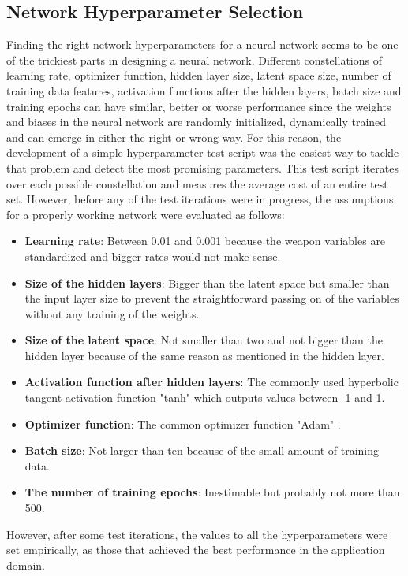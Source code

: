 \documentclass[MGS,Master,english]{twbook}%
\begin{document}
\subsection{Network Hyperparameter Selection} \label{chapter::vae::network}
Finding the right network hyperparameters for a neural network seems to be one of the trickiest parts in designing a neural network. Different constellations of learning rate, optimizer function, hidden layer size, latent space size, number of training data features, activation functions after the hidden layers, batch size and training epochs can have similar, better or worse performance since the weights and biases in the neural network are randomly initialized, dynamically trained and can emerge in either the right or wrong way. For this reason, the development of a simple hyperparameter test script was the easiest way to tackle that problem and detect the most promising parameters. This test script iterates over each possible constellation and measures the average cost of an entire test set. However, before any of the test iterations were in progress, the assumptions for a properly working network were evaluated as follows:
\begin{itemize}
	\item \textbf{Learning rate}: Between 0.01 and 0.001 because the weapon variables are standardized and bigger rates would not make sense.
	\item \textbf{Size of the hidden layers}: Bigger than the latent space but smaller than the input layer size to prevent the straightforward passing on of the variables without any training of the weights.
	\item \textbf{Size of the latent space}: Not smaller than two and not bigger than the hidden layer because of the same reason as mentioned in the hidden layer.
	\item \textbf{Activation function after hidden layers}: The commonly used hyperbolic tangent activation function  "tanh" which outputs values between -1 and 1. 
	\item \textbf{Optimizer function}: The common optimizer function "Adam" \cite{ml::optimizer::overview}.
	\item \textbf{Batch size}: Not larger than ten because of the small amount of training data.
	\item \textbf{The number of training epochs}: Inestimable but probably not more than 500.
\end{itemize}
However, after some test iterations, the values to all the hyperparameters were set empirically, as those that achieved the best performance in the application domain.
\end{document}
